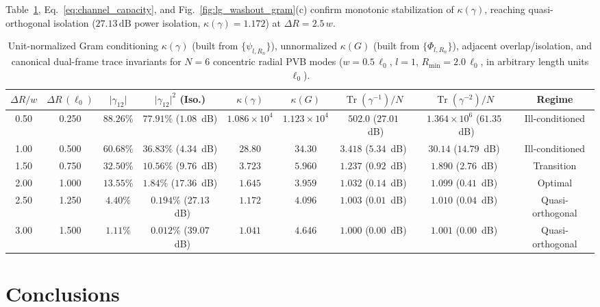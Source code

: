 \documentclass[aps,pra,reprint,nofootinbib,floatfix,longbibliography]{revtex4-2}
\theoremstyle{remark}
\newcommand{\abs}[1]{\lvert #1 \rvert}
\begin{document}
Table~\ref{tab:gram_matrix}, Eq.~\eqref{eq:channel_capacity}, and Fig.~\ref{fig:lg_washout_gram}(c) confirm monotonic stabilization of $\kappa(\gamma)$, reaching quasi-orthogonal isolation ($27.13\,\mathrm{dB}$ power isolation, $\kappa(\gamma) = 1.172$) at $\Delta R = 2.5\,w$.

\begin{table}[t]
\caption{Unit-normalized Gram conditioning $\kappa(\gamma)$ (built from $\{\psi_{l,R_n}\}$), unnormalized $\kappa(G)$ (built from $\{\Phi_{l,R_n}\}$), adjacent overlap/isolation, and canonical dual-frame trace invariants for $N = 6$ concentric radial PVB modes ($w = 0.5\,\ell_0$, $l = 1$, $R_{\min} = 2.0\,\ell_0$, in arbitrary length units $\ell_0$).}
\label{tab:gram_matrix}
\begin{ruledtabular}
\footnotesize
\setlength{\tabcolsep}{2.5pt}
\begin{tabular}{ccccccccc}
$\Delta R / w$ & $\Delta R\,(\ell_0)$ & $\abs{\gamma_{12}}$ & $\abs{\gamma_{12}}^2$ (Iso.) & $\kappa(\gamma)$ & $\kappa(G)$ & $\operatorname{Tr}(\gamma^{-1})/N$ & $\operatorname{Tr}(\gamma^{-2})/N$ & Regime \\
\hline
0.50 & 0.250 & $88.26\%$ & $77.91\%$ ($1.08$~dB) & $1.086\times 10^4$ & $1.123\times 10^4$ & $502.0$ ($27.01$~dB) & $1.364\times 10^6$ ($61.35$~dB) & Ill-conditioned \\
1.00 & 0.500 & $60.68\%$ & $36.83\%$ ($4.34$~dB) & $28.80$ & $34.30$ & $3.418$ ($5.34$~dB) & $30.14$ ($14.79$~dB) & Ill-conditioned \\
1.50 & 0.750 & $32.50\%$ & $10.56\%$ ($9.76$~dB) & $3.723$ & $5.960$ & $1.237$ ($0.92$~dB) & $1.890$ ($2.76$~dB) & Transition \\
2.00 & 1.000 & $13.55\%$ & $1.84\%$ ($17.36$~dB) & $1.645$ & $3.959$ & $1.032$ ($0.14$~dB) & $1.099$ ($0.41$~dB) & Optimal \\
2.50 & 1.250 & $4.40\%$ & $0.194\%$ ($27.13$~dB) & $1.172$ & $4.096$ & $1.003$ ($0.01$~dB) & $1.010$ ($0.04$~dB) & Quasi-orthogonal \\
3.00 & 1.500 & $1.11\%$ & $0.012\%$ ($39.07$~dB) & $1.041$ & $4.646$ & $1.000$ ($0.00$~dB) & $1.001$ ($0.00$~dB) & Quasi-orthogonal \\
\end{tabular}
\end{ruledtabular}
\end{table}

\section{Conclusions}
\label{sec:conclusions}
\end{document}
